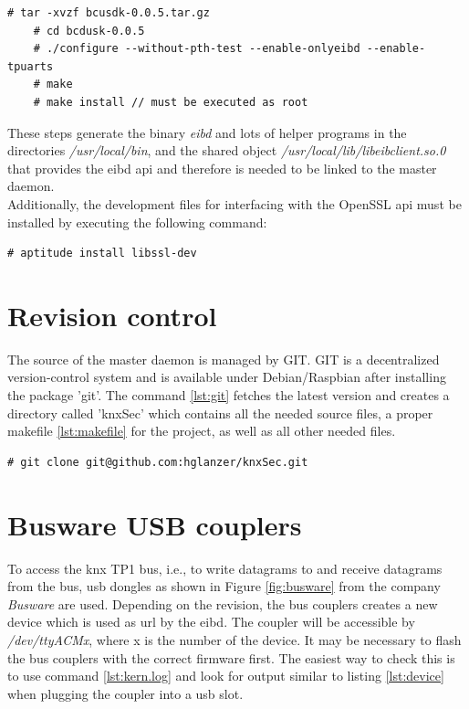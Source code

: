\begin{lstlisting}[style=BashInputStyle]
    # tar -xvzf bcusdk-0.0.5.tar.gz
    # cd bcdusk-0.0.5
    # ./configure --without-pth-test --enable-onlyeibd --enable-tpuarts
    # make
    # make install // must be executed as root
\end{lstlisting}
These steps generate the binary \textit{eibd} and lots of helper programs in the directories \textit{/usr/local/bin}, and the shared object
\textit{/usr/local/lib/libeibclient.so.0} that provides the \gls{eibd} \gls{api} and therefore is needed to be linked to the master daemon.
\\
Additionally, the development files for interfacing with the OpenSSL \gls{api} must be installed by executing the following command:
\begin{lstlisting}[style=BashInputStyle]
 # aptitude install libssl-dev
\end{lstlisting}

\section{Revision control}

The source of the master daemon is managed by GIT. GIT is a decentralized version-control system and is available under Debian/Raspbian after installing
the package 'git'. The command \ref{lst:git} fetches the latest version and creates a directory called 'knxSec' which contains all the needed source files,
a proper makefile \ref{lst:makefile} for the project, as well as all other needed files.

\begin{lstlisting}[style=BashInputStyle,label=lst:git]
    # git clone git@github.com:hglanzer/knxSec.git
\end{lstlisting}

\section{Busware USB couplers}

To access the \gls{knx} TP1 bus, i.e., to write datagrams to and receive datagrams from the bus, \gls{usb} dongles as shown in Figure \ref{fig:busware}
from the company \textit{Busware} are used. Depending on the revision, the bus couplers creates a new device which is used as \gls{url} by the \gls{eibd}.
The coupler will be accessible by \textit{/dev/ttyACMx}, where x is the number of the device. It may be necessary to flash the bus couplers with the correct
firmware first. The easiest way to check this is to use command \ref{lst:kern.log} and look for output similar to listing \ref{lst:device} when plugging 
the coupler into a \gls{usb} slot.


